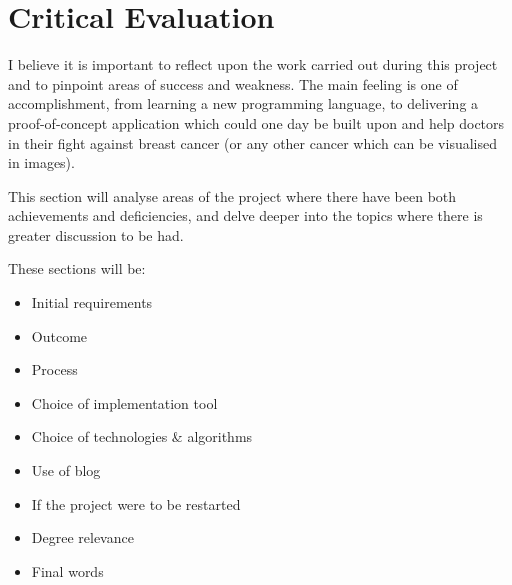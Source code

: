 \chapter{Critical Evaluation}





I believe it is important to reflect upon the work carried out during this project and to pinpoint areas of success and weakness. The main feeling is one of accomplishment, from learning a new programming language, to delivering a proof-of-concept application which could one day be built upon and help doctors in their fight against breast cancer (or any other cancer which can be visualised in images).

This section will analyse areas of the project where there have been both achievements and deficiencies, and delve deeper into the topics where there is greater discussion to be had.

These sections will be:
\begin{itemize}
  \item Initial requirements
  \item Outcome
  \item Process
  \item Choice of implementation tool
  \item Choice of technologies \& algorithms
  \item Use of blog
  \item If the project were to be restarted
  \item Degree relevance
  \item Final words
\end{itemize}

